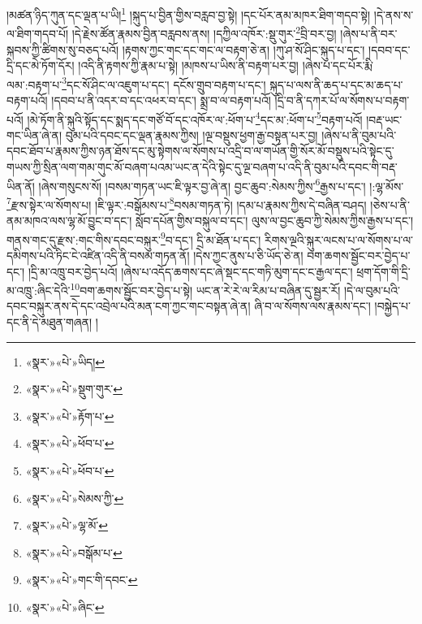 །མཚན་ཉིད་ཀུན་དང་ལྡན་པ་ཡི།\footnote{«སྣར་»«པེ་»ཡིད།} །སྐུད་པ་བྱིན་གྱིས་བརླབ་བྱ་སྟེ། །དང་པོར་ནམ་མཁར་ཐིག་གདབ་སྟེ། །དེ་ནས་ས་ལ་ཐིག་གདབ་པོ། །དེ་རྗེས་ཚོན་རྣམས་བྱིན་བརླབས་ནས། །དཀྱིལ་འཁོར་:སྡུ་གུར་\footnote{«སྣར་»«པེ་»སྡུག་གུར་}བྲི་བར་བྱ། །ཞེས་པ་ནི་བར་སྐབས་ཀྱི་ཚིགས་སུ་བཅད་པའོ། །རྟགས་ཀྱང་གང་དང་གང་ལ་བརྟག་ཅེ་ན། །ཀུ་ཤ་སོ་ཤིང་སྐུད་པ་དང་། །དབབ་དང་དྲི་དང་མེ་ཏོག་དོར། །འདི་ནི་རྟགས་ཀྱི་རྣམ་པ་སྟེ། །མཁས་པ་ཡིས་ནི་བརྟག་པར་བྱ། །ཞེས་པ་དང་པོར་རྨི་ལམ་:བརྟག་པ་\footnote{«སྣར་»«པེ་»རྟོག་པ་}དང་སོ་ཤིང་ལ་འཇུག་པ་དང་། དངོས་གྲུབ་བརྟག་པ་དང་། སྐུད་པ་ལས་ནི་ཆད་པ་དང་མ་ཆད་པ་བརྟག་པའོ། །དབབ་པ་ནི་འདར་བ་དང་འཕར་བ་དང་། སྨྲ་བ་ལ་བརྟག་པའོ། །དྲི་བ་ནི་དཀར་པོ་ལ་སོགས་པ་བརྟག་པའོ། །མེ་ཏོག་ནི་སྐུའི་སྟོད་དང་སྨད་དང་གཙོ་བོ་དང་འཁོར་ལ་:ཕོག་པ་\footnote{«སྣར་»«པེ་»ཕོབ་པ་}དང་མ་:ཕོག་པ་\footnote{«སྣར་»«པེ་»ཕོབ་པ་}བརྟག་པའོ། །བརྡ་ཡང་གང་ཡིན་ཞེ་ན། བུམ་པའི་དབང་དང་ལྡན་རྣམས་ཀྱིས། །ལྔ་བསྡུས་ཕྱག་རྒྱ་བསྟན་པར་བྱ། །ཞེས་པ་ནི་བུམ་པའི་དབང་ཐོབ་པ་རྣམས་ཀྱིས་ཉན་ཐོས་དང་མུ་སྟེགས་ལ་སོགས་པ་འདྲི་བ་ལ་གཡོན་གྱི་སོར་མོ་བསྡུས་པའི་སྟེང་དུ་གཡས་ཀྱི་སྲིན་ལག་གམ་གུང་མོ་བཞག་པའམ་ཡང་ན་དེའི་སྟེང་དུ་ལྔ་བཞག་པ་འདི་ནི་བུམ་པའི་དབང་གི་བརྡ་ཡིན་ནོ། །ཞེས་གསུངས་སོ། །བསམ་གཏན་ཡང་ཇི་ལྟར་བྱ་ཞེ་ན། བྱང་ཆུབ་:སེམས་ཀྱིས་\footnote{«སྣར་»«པེ་»སེམས་ཀྱི་}རྒྱས་པ་དང་། །:ལྷ་མོས་\footnote{«སྣར་»«པེ་»ལྷ་མོ་}རྫས་སྟེར་ལ་སོགས་པ། །ཇི་ལྟར་:བསྒོམས་པ་\footnote{«སྣར་»«པེ་»བསྒོམ་པ་}བསམ་གཏན་ཏེ། །དམ་པ་རྣམས་ཀྱིས་དེ་བཞིན་བཤད། །ཅེས་པ་ནི་ནམ་མཁའ་ལས་ལྷ་མོ་བྱུང་བ་དང་། སློབ་དཔོན་གྱིས་བསྐུལ་བ་དང་། ལུས་ལ་བྱང་ཆུབ་ཀྱི་སེམས་ཀྱིས་རྒྱས་པ་དང་། གནས་གང་དུ་རྫས་:གང་གིས་དབང་བསྐུར་\footnote{«སྣར་»«པེ་»གང་གི་དབང་}བ་དང་། དྲི་མ་ཐོན་པ་དང་། རིགས་ལྔའི་སྐུར་ལངས་པ་ལ་སོགས་པ་ལ་དམིགས་པའི་ཏིང་ངེ་འཛིན་འདི་ནི་བསམ་གཏན་ནོ། །དེས་ཀྱང་ནུས་པ་ཅི་ཡོད་ཅེ་ན། བག་ཆགས་སྦྱོང་བར་བྱེད་པ་དང་། །དྲི་མ་འཁྲུ་བར་བྱེད་པའོ། །ཞེས་པ་འདོད་ཆགས་དང་ཞེ་སྡང་དང་གཏི་མུག་དང་ང་རྒྱལ་དང་། ཕྲག་དོག་གི་དྲི་མ་འཁྲུ་:ཞིང་དེའི་\footnote{«སྣར་»«པེ་»ཞིང་}བག་ཆགས་སྦྱོང་བར་བྱེད་པ་སྟེ། ཡང་ན་རེ་རེ་ལ་རིམ་པ་བཞིན་དུ་སྦྱར་རོ། །དེ་ལ་བུམ་པའི་དབང་བསྐུར་ནས་དེ་དང་འབྲེལ་པའི་མན་ངག་ཀྱང་གང་བསྟན་ཞེ་ན། ཞི་བ་ལ་སོགས་ལས་རྣམས་དང་། །བསྐྱེད་པ་དང་ནི་དེ་མཐུན་གཞན། །
